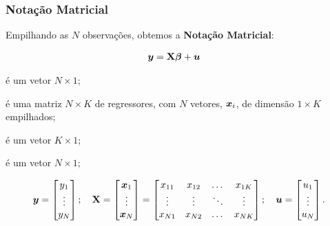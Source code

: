 \documentclass[11pt, oneside, a4paper, article]{article}
\numberwithin{equation}{section}
\begin{document}
\subsubsection{Notação Matricial}
Empilhando as $N$ observações, obtemos a \textbf{Notação Matricial}:

\vspace{-1 em}
\begin{align} \label{ols:mod:mat}
	\boldsymbol{y} &= \mathbf{X} \boldsymbol{\beta} + \boldsymbol{u} 
\end{align}

\begin{description}[noitemsep]
\item [$\mbs{y}$]  é um vetor $N \times 1$;

\item [$\Xmat$]  é uma matriz $N \times K$ de regressores, com $N$ vetores, $\boldsymbol{x}_{i}$, de dimensão $1 \times K$ empilhados;

\item [$\mbs{\beta}$] é um vetor $K \times 1$;

\item [$\mbs{u}$] é um vetor $N \times 1$;
\end{description}

\vspace{-1 em}
\begin{align*}
\boldsymbol{y} = 
\begin{bmatrix}
	y_{1} \\ \vdots \\ y_{N}		
\end{bmatrix};
\quad
\mathbf{X} = 
\begin{bmatrix}
	\boldsymbol{x}_{1} \\ \vdots \\ \boldsymbol{x}_{N}
\end{bmatrix} = 
\begin{bmatrix}
	x_{11}     & x_{12}     & \dots  & x_{1K} \\          
	\vdots     & \vdots     & \ddots & \vdots \\        
	x_{N1} & x_{N2} & \dots  & x_{NK}		
\end{bmatrix};
\quad
\boldsymbol{u} = 
\begin{bmatrix}
	u_{1} \\ \vdots \\ u_{N}		
\end{bmatrix}.
\end{align*}
\end{document}
